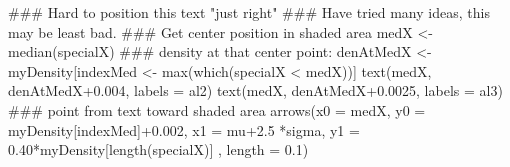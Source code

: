 \begin{Schunk}
\begin{Sinput}
 ### Hard to position this text "just right"
 ### Have tried many ideas, this may be least bad.
 ### Get center position in shaded area
 medX <- median(specialX)
 ### density at that center point:
 denAtMedX <- myDensity[indexMed <- max(which(specialX < medX))]
 text(medX, denAtMedX+0.004, labels = al2)
 text(medX, denAtMedX+0.0025, labels = al3)
 ### point from text toward shaded area
 arrows(x0 = medX, y0 = myDensity[indexMed]+0.002, x1 = mu+2.5 *sigma, y1 = 0.40*myDensity[length(specialX)] ,   length = 0.1)
\end{Sinput}
\end{Schunk}
